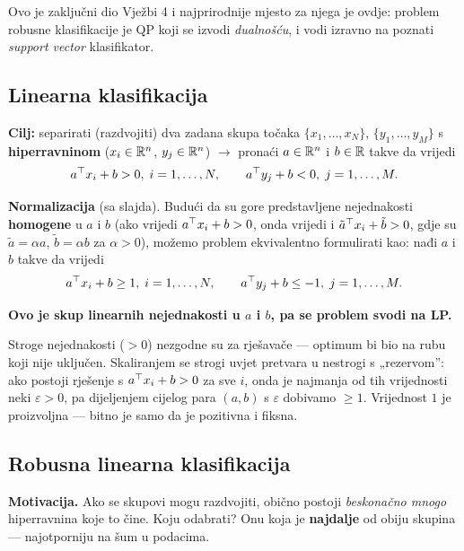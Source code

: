 Ovo je zaključni dio Vježbi 4 i najprirodnije mjesto za njega je ovdje: problem
robusne klasifikacije je QP koji se izvodi \emph{dualnošću}, i vodi izravno na
poznati \emph{support vector} klasifikator.

\subsection{Linearna klasifikacija}

\begin{definicija}
\textbf{Cilj:} separirati (razdvojiti) dva zadana skupa točaka
$\{x_1,\dots,x_N\}$, $\{y_1,\dots,y_M\}$ s \textbf{hiperravninom}
($x_i \in \mathbb{R}^n$, $y_j \in \mathbb{R}^n$) $\to$ pronaći $a \in \mathbb{R}^n$ i $b \in \mathbb{R}$ takve
da vrijedi
\[
a^{\top} x_i + b > 0,\; i = 1,\dots,N, \qquad
a^{\top} y_j + b < 0,\; j = 1,\dots,M.
\]
\end{definicija}

\textbf{Normalizacija} (sa slajda). Budući da su gore predstavljene
nejednakosti \textbf{homogene} u $a$ i $b$ (ako vrijedi $a^{\top} x_i + b > 0$, onda
vrijedi i $\tilde a^{\top} x_i + \tilde b > 0$, gdje su $\tilde a = \alpha a$,
$\tilde b = \alpha b$ za $\alpha > 0$), možemo problem ekvivalentno formulirati
kao: nađi $a$ i $b$ takve da vrijedi
\begin{equation}
\label{eq:klasifikacija}
a^{\top} x_i + b \ge 1,\; i = 1,\dots,N, \qquad
a^{\top} y_j + b \le -1,\; j = 1,\dots,M.
\end{equation}

\textbf{Ovo je skup linearnih nejednakosti u $a$ i $b$, pa se problem svodi na
LP.}

\begin{napomena}
Stroge nejednakosti ($> 0$) nezgodne su za rješavače --- optimum bi bio na rubu
koji nije uključen. Skaliranjem se strogi uvjet pretvara u nestrogi s
„rezervom”: ako postoji rješenje s $a^{\top} x_i + b > 0$ za sve $i$, onda je
najmanja od tih vrijednosti neki $\varepsilon > 0$, pa dijeljenjem cijelog para
$(a,b)$ s $\varepsilon$ dobivamo $\ge 1$. Vrijednost $1$ je proizvoljna --- bitno
je samo da je pozitivna i fiksna.
\end{napomena}

\subsection{Robusna linearna klasifikacija}

\textbf{Motivacija.} Ako se skupovi mogu razdvojiti, obično postoji
\emph{beskonačno mnogo} hiperravnina koje to čine. Koju odabrati? Onu koja je
\textbf{najdalje} od obiju skupina --- najotporniju na šum u podacima.

